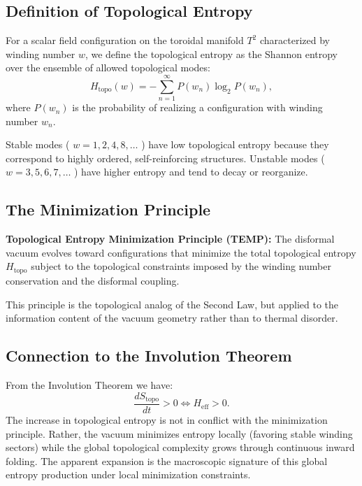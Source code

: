 \documentclass[11pt,a4paper]{article}
\begin{document}
\subsection{Definition of Topological Entropy}
For a scalar field configuration on the toroidal manifold \(T^2\) characterized by winding number \(w\), we define the topological entropy as the Shannon entropy over the ensemble of allowed topological modes:
\begin{equation}
H_{\mathrm{topo}}(w) = -\sum_{n = 1}^{\infty}P(w_n)\log_2P(w_n), \tag{58}
\end{equation}
where \(P(w_n)\) is the probability of realizing a configuration with winding number \(w_n\).

Stable modes ( \(w = 1,2,4,8,\ldots\) ) have low topological entropy because they correspond to highly ordered, self-reinforcing structures. Unstable modes ( \(w = 3,5,6,7,\ldots\) ) have higher entropy and tend to decay or reorganize.

\subsection{The Minimization Principle}
\textbf{Topological Entropy Minimization Principle (TEMP):} The disformal vacuum evolves toward configurations that minimize the total topological entropy \(H_{\mathrm{topo}}\) subject to the topological constraints imposed by the winding number conservation and the disformal coupling.

This principle is the topological analog of the Second Law, but applied to the information content of the vacuum geometry rather than to thermal disorder.

\subsection{Connection to the Involution Theorem}
From the Involution Theorem we have:
\begin{equation}
\frac{dS_{\mathrm{topo}}}{dt} >0\iff H_{\mathrm{eff}} > 0. \tag{59}
\end{equation}
The increase in topological entropy is not in conflict with the minimization principle. Rather, the vacuum minimizes entropy locally (favoring stable winding sectors) while the global topological complexity grows through continuous inward folding. The apparent expansion is the macroscopic signature of this global entropy production under local minimization constraints.
\end{document}
